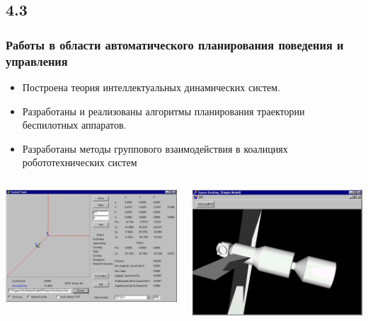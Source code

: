 \documentclass[default]{beamer}
\begin{document}
	\subsection{4.3}
	\begin{frame}
		\frametitle{Работы в  области автоматического планирования поведения и управления}
		
		\begin{itemize}
			\item Построена теория интеллектуальных динамических систем.
			\item Разработаны и реализованы алгоритмы планирования траектории беспилотных аппаратов.
			\item Разработаны методы группового взаимодействия в коалициях робототехнических систем
		\end{itemize}
		\begin{columns}
			\begin{column}{0.45\textwidth}
				\includegraphics[width=\textwidth]{misc/control/space_control1.png}
			\end{column}
			\begin{column}{0.45\textwidth}
				\includegraphics[width=\textwidth]{misc/control/space_control2.png}
			\end{column}
		\end{columns}
	\end{frame}
\end{document}
